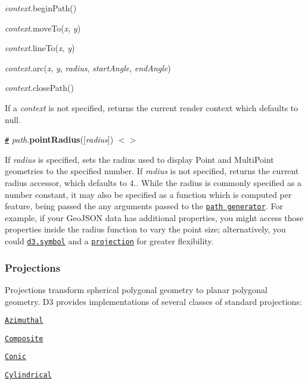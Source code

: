 \begin{DoxyItemize}
\item {\itshape context}.begin\+Path()
\item {\itshape context}.move\+To({\itshape x}, {\itshape y})
\item {\itshape context}.line\+To({\itshape x}, {\itshape y})
\item {\itshape context}.arc({\itshape x}, {\itshape y}, {\itshape radius}, {\itshape start\+Angle}, {\itshape end\+Angle})
\item {\itshape context}.close\+Path()
\end{DoxyItemize}

If a {\itshape context} is not specified, returns the current render context which defaults to null.

\href{#path_pointRadius}{\tt \#} {\itshape path}.{\bfseries point\+Radius}(\mbox{[}{\itshape radius}\mbox{]}) \href{https://github.com/d3/d3-geo/blob/master/src/path/index.js#L59}{\tt $<$$>$}

If {\itshape radius} is specified, sets the radius used to display Point and Multi\+Point geometries to the specified number. If {\itshape radius} is not specified, returns the current radius accessor, which defaults to 4.. While the radius is commonly specified as a number constant, it may also be specified as a function which is computed per feature, being passed the any arguments passed to the \href{#_path}{\tt path generator}. For example, if your Geo\+J\+S\+ON data has additional properties, you might access those properties inside the radius function to vary the point size; alternatively, you could \href{https://github.com/d3/d3-shape#symbols}{\tt d3.\+symbol} and a \href{#geoProjection}{\tt projection} for greater flexibility.

\subsubsection*{Projections}

Projections transform spherical polygonal geometry to planar polygonal geometry. D3 provides implementations of several classes of standard projections\+:


\begin{DoxyItemize}
\item \href{#azimuthal-projections}{\tt Azimuthal}
\item \href{#composite-projections}{\tt Composite}
\item \href{#conic-projections}{\tt Conic}
\item \href{#cylindrical-projections}{\tt Cylindrical}
\end{DoxyItemize}

